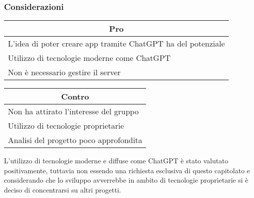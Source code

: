 \subsubsection{Considerazioni}
\begin{minipage}[t]{0.45\linewidth}
    \vspace{0pt}
    {\renewcommand{\arraystretch}{1.5}
    \begin{tabular}{p{1\linewidth}}
        \multicolumn{1}{c}{\textbf{Pro}} \\
        \midrule
        L'idea di poter creare app tramite ChatGPT ha del potenziale \\
        Utilizzo di tecnologie moderne come ChatGPT \\
        Non è necessario gestire il server \\
        \hline
    \end{tabular}
    }
\end{minipage}
\hspace{0.05\linewidth}
\begin{minipage}[t]{0.45\linewidth}
    \vspace{0pt}
    {\renewcommand{\arraystretch}{1.5}
    \begin{tabular}{p{1\linewidth}}
        \multicolumn{1}{c}{\textbf{Contro}} \\
        \midrule
        Non ha attirato l'interesse del gruppo \\
        Utilizzo di tecnologie proprietarie \\
        Analisi del progetto poco approfondita \\
        \hline
    \end{tabular}
    }
\end{minipage}
\vspace{1em}

L'utilizzo di tecnologie moderne e diffuse come ChatGPT è stato valutato positivamente, tuttavia non essendo una richiesta esclusiva di questo capitolato e considerando che lo sviluppo avverrebbe in ambito di tecnologie proprietarie si è deciso di concentrarsi su altri progetti.